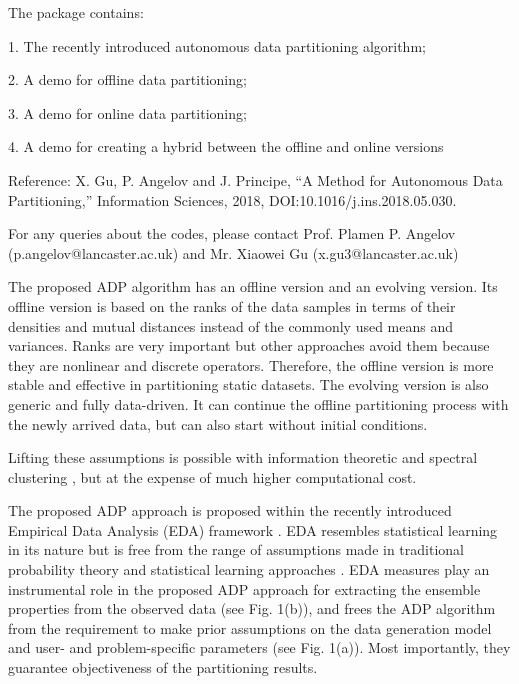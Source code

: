 {The package contains:

1. The recently introduced autonomous data partitioning algorithm;

2. A demo for offline data partitioning;

3. A demo for online data partitioning;

4. A demo for creating a hybrid between the offline and online versions

Reference: X. Gu, P. Angelov and J. Principe, “A Method for Autonomous Data Partitioning,” Information Sciences, 2018, DOI:10.1016/j.ins.2018.05.030.

For any queries about the codes, please contact Prof. Plamen P. Angelov (p.angelov@lancaster.ac.uk) and Mr. Xiaowei Gu (x.gu3@lancaster.ac.uk)

The proposed ADP algorithm has an offline version and an evolving version. Its offline version is based on the ranks of the data samples in terms of their densities and mutual distances instead of the commonly used means and variances. Ranks are very important but other approaches avoid them because they are nonlinear and discrete operators. Therefore,
the offline version is more stable and effective in partitioning static datasets. The evolving version is also generic and fully
data-driven. It can continue the offline partitioning process with the newly arrived data, but can also start without initial
conditions.

Lifting these assumptions is possible with information theoretic \cite{JenssenErdogmus2007-5673} and spectral clustering \cite{vonLuxburg2007-5674}, but at the expense of much higher computational cost.

The proposed ADP approach is proposed within the recently introduced Empirical Data Analysis (EDA) framework \cite{Angelov2014Outside,Angelov2016-7844219,Angelov2017Empirical}.
EDA resembles statistical learning in its nature but is free from the range of assumptions made in traditional probability theory and statistical learning approaches \cite{Angelov2014Outside,Angelov2016-7844219,Angelov2017Empirical}. EDA measures play an instrumental role in the proposed ADP approach for extracting the ensemble properties from the observed data (see Fig. 1(b)), and frees the ADP algorithm from the requirement to make prior assumptions on the data generation model and user- and problem-specific parameters (see Fig. 1(a)). Most importantly, they guarantee objectiveness of the partitioning results.

}
